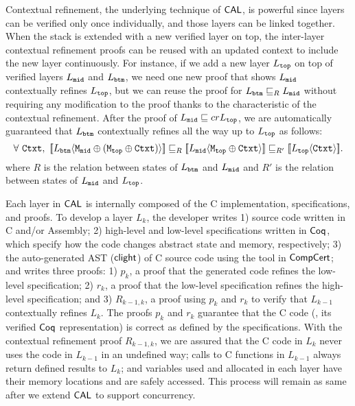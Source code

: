 Contextual refinement, the underlying technique of $\mathsf{CAL}$, is powerful since layers can be verified only once individually, and those layers can be linked together.
 When the stack is extended with a new verified layer on top, 
 the inter-layer contextual refinement proofs can be reused with an updated context to include the new layer continuously. 
For instance, if we add a new layer $L_{{\mathrm{\texttt{top}}}}$ on top of verified layers $L_{{\mathrm{\texttt{mid}}}}$ and $L_{{\mathrm{\texttt{btm}}}}$, 
we need one new proof that shows $L_{{\mathrm{\texttt{mid}}}}$ contextually refines $L_{{\mathrm{\texttt{top}}}}$, but we can reuse the proof for $L_{{\mathrm{\texttt{btm}}}} \sqsubseteq_{R} L_{{\mathrm{\texttt{mid}}}}$ without requiring any modification to the proof thanks to the characteristic of the contextual refinement. After the proof of $L_{{\mathrm{\texttt{mid}}}} \sqsubseteq{cr} L_{{\mathrm{\texttt{top}}}}$, we are automatically guaranteed that $L_{{\mathrm{\texttt{btm}}}}$ contextually refines all the way up to $L_{{\mathrm{\texttt{top}}}}$ as follows:
$$
\forall\ \codeinmath{Ctxt},\ \sem{L_{\codeinmath{btm}}}{\codeinmath{M}_{\codeinmath{mid}}\oplus (\codeinmath{M}_{\codeinmath{top}}\oplus \codeinmath{Ctxt})} \refines_{R}  \sem{L_{\codeinmath{mid}}}{\codeinmath{M}_{\codeinmath{top}} \oplus \codeinmath{Ctxt}} \refines_{R'} \sem{L_{\codeinmath{top}}}{\codeinmath{Ctxt}}. 
$$ 
where $R$ is the relation between states of $ L_{{\mathrm{\texttt{btm}}}}$ and $L_{{\mathrm{\texttt{mid}}}}$ and $R'$ is the relation between states of 
 $ L_{{\mathrm{\texttt{mid}}}}$ and $L_{{\mathrm{\texttt{top}}}}$.


Each layer in $\mathsf{CAL}$ is internally composed of the C implementation, specifications, and proofs.
To develop a layer $L_k$, 
the developer writes 
1) source code written in C and/or Assembly; 
2) high-level and  low-level specifications written in $\mathsf{Coq}$, which specify how the code changes abstract state and memory, respectively; 
3) the auto-generated AST ($\mathsf{clight}$) of C source code using the tool in $\mathsf{CompCert}$; 
and writes three proofs: 
1) $p_k$, a proof that the generated code refines the low-level specification; 
2) $r_k$, a proof that the low-level specification refines the high-level specification; and 
3) $R_{k-1,k}$, a proof using $p_k$ and $r_k$ to verify that $L_{k-1}$ contextually refines $L_{k}$. 
The proofs $p_k$ and $r_k$ guarantee that the C code (\ie , its verified $\mathsf{Coq}$ representation) is correct as defined by the specifications.
 With the contextual refinement proof $R_{k-1, k}$, we are assured that the C code in $L_k$ never uses the code in $L_{k-1}$ in an undefined way; 
 calls to C functions in $L_{k-1}$ always return defined results to $L_k$; and variables 
 used and allocated in each layer have their memory locations and are safely accessed.
 This process will remain as same after we extend $\mathsf{CAL}$ to support concurrency.
